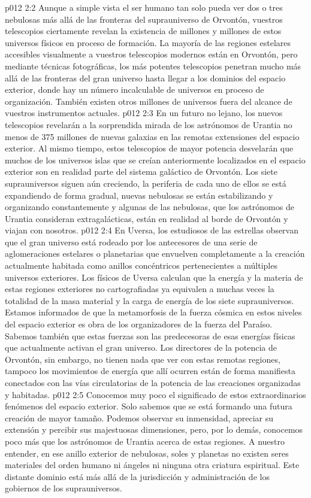 \vs p012 2:2 Aunque a simple vista el ser humano tan solo pueda ver dos o tres nebulosas más allá de las fronteras del suprauniverso de Orvontón, vuestros telescopios ciertamente revelan la existencia de millones y millones de estos universos físicos en proceso de formación. La mayoría de las regiones estelares accesibles visualmente a vuestros telescopios modernos están en Orvontón, pero mediante técnicas fotográficas, los más potentes telescopios penetran mucho más allá de las fronteras del gran universo hasta llegar a los dominios del espacio exterior, donde hay un número incalculable de universos en proceso de organización. También existen otros millones de universos fuera del alcance de vuestros instrumentos actuales.
\vs p012 2:3 En un futuro no lejano, los nuevos telescopios revelarán a la sorprendida mirada de los astrónomos de Urantia no menos de 375 millones de nuevas galaxias en las remotas extensiones del espacio exterior. Al mismo tiempo, estos telescopios de mayor potencia desvelarán que muchos de los universos islas que se creían anteriormente localizados en el espacio exterior son en realidad parte del sistema galáctico de Orvontón. Los siete suprauniversos siguen aún creciendo, la periferia de cada uno de ellos se está expandiendo de forma gradual, nuevas nebulosas se están estabilizando y organizando constantemente y algunas de las nebulosas, que los astrónomos de Urantia consideran extragalácticas, están en realidad al borde de Orvontón y viajan con nosotros.
\vs p012 2:4 \pc En Uversa, los estudiosos de las estrellas observan que el gran universo está rodeado por los antecesores de una serie de aglomeraciones estelares o planetarias que envuelven completamente a la creación actualmente habitada como anillos concéntricos pertenecientes a múltiples universos exteriores. Los físicos de Uversa calculan que la energía y la materia de estas regiones exteriores no cartografiadas ya equivalen a muchas veces la totalidad de la masa material y la carga de energía de los siete suprauniversos. Estamos informados de que la metamorfosis de la fuerza cósmica en estos niveles del espacio exterior es obra de los organizadores de la fuerza del Paraíso. Sabemos también que estas fuerzas son las predecesoras de esas energías físicas que actualmente activan el gran universo. Los directores de la potencia de Orvontón, sin embargo, no tienen nada que ver con estas remotas regiones, tampoco los movimientos de energía que allí ocurren están de forma manifiesta conectados con las vías circulatorias de la potencia de las creaciones organizadas y habitadas.
\vs p012 2:5 \pc Conocemos muy poco el significado de estos extraordinarios fenómenos del espacio exterior. Solo sabemos que se está formando una futura creación de mayor tamaño. Podemos observar su inmensidad, apreciar su extensión y percibir sus majestuosas dimensiones, pero, por lo demás, conocemos poco más que los astrónomos de Urantia acerca de estas regiones. A nuestro entender, en ese anillo exterior de nebulosas, soles y planetas no existen seres materiales del orden humano ni ángeles ni ninguna otra criatura espiritual. Este distante dominio está más allá de la jurisdicción y administración de los gobiernos de los suprauniversos.
